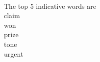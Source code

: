 \begin{answer}\\
The top 5 indicative words are\\
claim\\
won\\
prize\\
tone\\
urgent\\
\end{answer}
